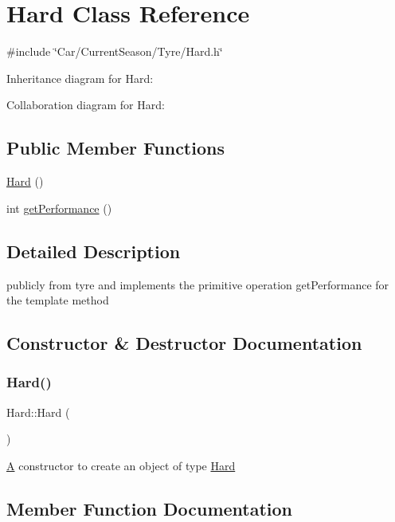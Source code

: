 \hypertarget{classHard}{}\section{Hard Class Reference}
\label{classHard}


{\ttfamily \#include \char`\"{}Car/\+Current\+Season/\+Tyre/\+Hard.\+h\char`\"{}}



Inheritance diagram for Hard\+:


Collaboration diagram for Hard\+:
\subsection*{Public Member Functions}
\begin{DoxyCompactItemize}
\item 
\hyperlink{classHard_adcaa89711149600a6fb45f8a75422bac}{Hard} ()
\item 
int \hyperlink{classHard_a0efda977538c97c69d69a81b5f526b59}{get\+Performance} ()
\end{DoxyCompactItemize}


\subsection{Detailed Description}
publicly from tyre and implements the primitive operation get\+Performance for the template method 

\subsection{Constructor \& Destructor Documentation}
\mbox{\label{classHard_adcaa89711149600a6fb45f8a75422bac}} 
\subsubsection{\texorpdfstring{Hard()}{Hard()}}
{\footnotesize\ttfamily Hard\+::\+Hard (\begin{DoxyParamCaption}{ }\end{DoxyParamCaption})}

\hyperlink{classA}{A} constructor to create an object of type \hyperlink{classHard}{Hard} 

\subsection{Member Function Documentation}
\mbox{\label{classHard_a0efda977538c97c69d69a81b5f526b59}} 

